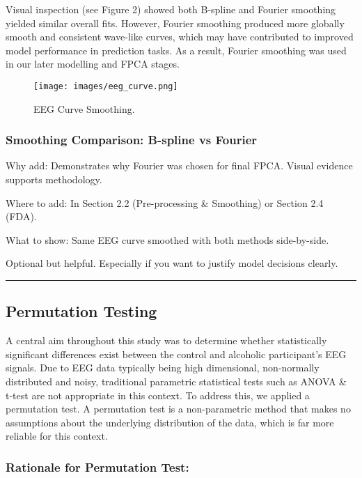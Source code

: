 \documentclass{article}
\begin{document}
Visual inspection (see Figure 2) showed both B-spline and Fourier
smoothing yielded similar overall fits. However, Fourier smoothing
produced more globally smooth and consistent wave-like curves, which may
have contributed to improved model performance in prediction tasks. As a
result, Fourier smoothing was used in our later modelling and FPCA
stages.

\begin{figure}[H]
\centering
\texttt{[image: images/eeg\_curve.png]}
\caption{EEG Curve Smoothing.}
\end{figure}

\subsubsection{Smoothing Comparison: B-spline vs
Fourier}\label{smoothing-comparison-b-spline-vs-fourier}

Why add: Demonstrates why Fourier was chosen for final FPCA. Visual
evidence supports methodology.

Where to add: In Section 2.2 (Pre-processing \& Smoothing) or Section
2.4 (FDA).

What to show: Same EEG curve smoothed with both methods side-by-side.

Optional but helpful. Especially if you want to justify model decisions
clearly.

\begin{center}\rule{0.5\linewidth}{0.5pt}\end{center}

\subsection{Permutation Testing}\label{permutation-testing}

A central aim throughout this study was to determine whether
statistically significant differences exist between the control and
alcoholic participant's EEG signals. Due to EEG data typically being
high dimensional, non-normally distributed and noisy, traditional
parametric statistical tests such as ANOVA \& t-test are not appropriate
in this context. To address this, we applied a permutation test. A
permutation test is a non-parametric method that makes no assumptions
about the underlying distribution of the data, which is far more
reliable for this context.

\subsubsection{Rationale for Permutation
Test:}\label{rationale-for-permutation-test}
\end{document}
